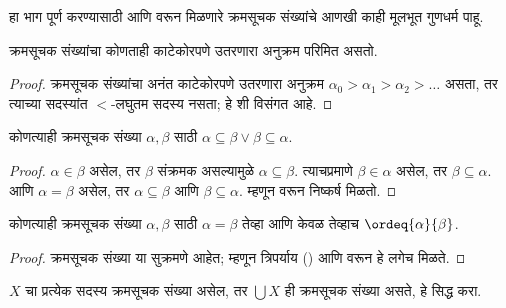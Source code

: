 \documentclass[../../../include/open-logic-section]{subfiles}
\begin{document}
हा भाग पूर्ण करण्यासाठी  आणि  वरून मिळणारे क्रमसूचक संख्यांचे आणखी काही मूलभूत गुणधर्म पाहू.

\begin{prop}
क्रमसूचक संख्यांचा कोणताही काटेकोरपणे उतरणारा अनुक्रम परिमित असतो.
\end{prop}

\begin{proof}
क्रमसूचक संख्यांचा अनंत काटेकोरपणे उतरणारा अनुक्रम $\alpha_0 > \alpha_1 > \alpha_2 > \ldots$ असता, तर त्याच्या सदस्यांत $<$-लघुतम सदस्य नसता; हे  शी विसंगत आहे.
\end{proof}

\begin{prop}
कोणत्याही क्रमसूचक संख्या $\alpha, \beta$ साठी $\alpha \subseteq \beta \lor \beta \subseteq \alpha$.
\end{prop}

\begin{proof}
$\alpha \in \beta$ असेल, तर $\beta$ संक्रमक असल्यामुळे $\alpha \subseteq \beta$. त्याचप्रमाणे $\beta \in \alpha$ असेल, तर $\beta \subseteq
\alpha$. आणि $\alpha = \beta$ असेल, तर $\alpha \subseteq \beta$ आणि $\beta \subseteq \alpha$. म्हणून  वरून निष्कर्ष मिळतो.
\end{proof}

\begin{prop}
कोणत्याही क्रमसूचक संख्या $\alpha, \beta$ साठी $\alpha = \beta$ तेव्हा आणि केवळ तेव्हाच $\ordeq{\alpha}{\beta}$.
\end{prop}

\begin{proof}
क्रमसूचक संख्या या सुक्रमणे आहेत; म्हणून त्रिपर्याय () आणि  वरून हे लगेच मिळते.
\end{proof}

\begin{prob}
$X$ चा प्रत्येक सदस्य क्रमसूचक संख्या असेल, तर $\bigcup X$ ही क्रमसूचक संख्या असते, हे सिद्ध करा.
\end{prob}
\end{document}
